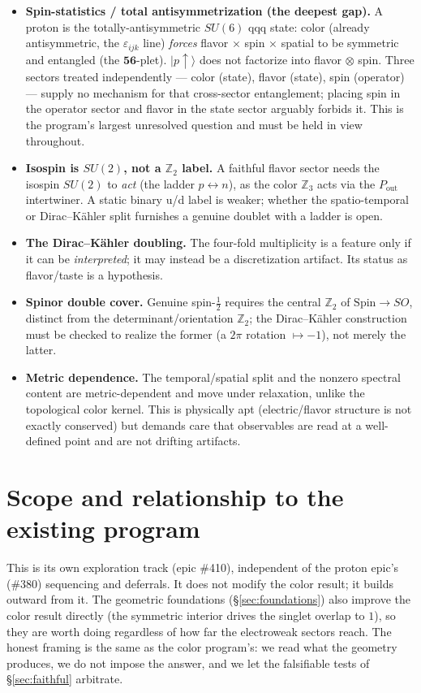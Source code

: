 \documentclass[11pt]{article}
\theoremstyle{definition}
\newcommand{\Z}{\mathbb{Z}}
\newcommand{\Pout}{P_{\mathrm{out}}}
\begin{document}
\begin{itemize}[nosep]
  \item \textbf{Spin-statistics / total antisymmetrization (the deepest gap).} A proton
  is the totally-antisymmetric $SU(6)$ qqq state: color (already antisymmetric, the
  $\varepsilon_{ijk}$ line) \emph{forces} flavor $\times$ spin $\times$ spatial to be
  symmetric and entangled (the $\mathbf{56}$-plet). $\lvert p\!\uparrow\rangle$ does not
  factorize into flavor $\otimes$ spin. Three sectors treated independently --- color
  (state), flavor (state), spin (operator) --- supply no mechanism for that cross-sector
  entanglement; placing spin in the operator sector and flavor in the state sector
  arguably forbids it. This is the program's largest unresolved question and must be held
  in view throughout.
  \item \textbf{Isospin is $SU(2)$, not a $\Z_2$ label.} A faithful flavor sector needs
  the isospin $SU(2)$ to \emph{act} (the ladder $p\leftrightarrow n$), as the color
  $\Z_3$ acts via the $\Pout$ intertwiner. A static binary u/d label is weaker; whether
  the spatio-temporal or Dirac--K\"ahler split furnishes a genuine doublet with a ladder
  is open.
  \item \textbf{The Dirac--K\"ahler doubling.} The four-fold multiplicity is a feature
  only if it can be \emph{interpreted}; it may instead be a discretization artifact. Its
  status as flavor/taste is a hypothesis.
  \item \textbf{Spinor double cover.} Genuine spin-$\tfrac12$ requires the central $\Z_2$
  of $\mathrm{Spin}\to SO$, distinct from the determinant/orientation $\Z_2$; the
  Dirac--K\"ahler construction must be checked to realize the former (a $2\pi$ rotation
  $\mapsto -1$), not merely the latter.
  \item \textbf{Metric dependence.} The temporal/spatial split and the nonzero spectral
  content are metric-dependent and move under relaxation, unlike the topological color
  kernel. This is physically apt (electric/flavor structure is not exactly conserved) but
  demands care that observables are read at a well-defined point and are not drifting
  artifacts.
\end{itemize}

\section{Scope and relationship to the existing program}
\label{sec:scope}

This is its own exploration track (epic \#410), independent of the proton epic's (\#380)
sequencing and deferrals. It does not modify the color result; it builds outward from it.
The geometric foundations (\S\ref{sec:foundations}) also improve the color result
directly (the symmetric interior drives the singlet overlap to $1$), so they are worth
doing regardless of how far the electroweak sectors reach. The honest framing is the same
as the color program's: we read what the geometry produces, we do not impose the answer,
and we let the falsifiable tests of \S\ref{sec:faithful} arbitrate.
\end{document}
